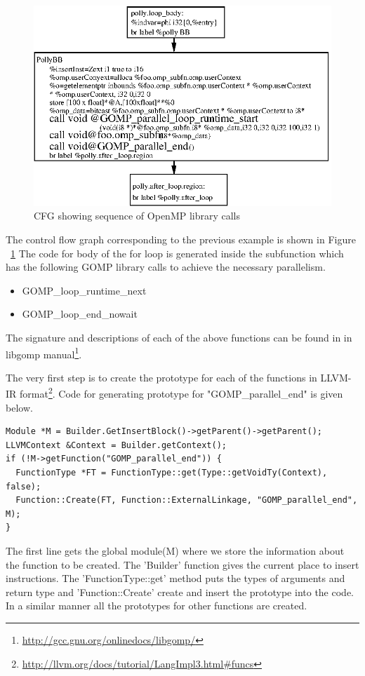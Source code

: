 \begin{figure}
\begin{center}
  \includegraphics[width=14cm]{images/ompcalls.eps}
  \caption{CFG showing sequence of OpenMP library calls}
  \label{fig:openmp_cfg}
\end{center}
\end{figure}

The control flow graph corresponding to the previous example is shown in Figure ~\ref{fig:openmp_cfg}
The code for body of the for loop is generated inside the subfunction which has the following GOMP library
calls to achieve the necessary parallelism.

\begin{itemize}
\item GOMP\_loop\_runtime\_next
\item GOMP\_loop\_end\_nowait
\end{itemize}

The signature and descriptions of each of the above functions can be found in in libgomp manual\footnote{\url{http://gcc.gnu.org/onlinedocs/libgomp/}}.

The very first step is to create the prototype for each of the functions in LLVM-IR format\footnote{\url{http://llvm.org/docs/tutorial/LangImpl3.html\#funcs}}.
Code for generating prototype for "GOMP\_parallel\_end" is given below.
{\footnotesize
\begin{lstlisting}
Module *M = Builder.GetInsertBlock()->getParent()->getParent();
LLVMContext &Context = Builder.getContext();
if (!M->getFunction("GOMP_parallel_end")) {
  FunctionType *FT = FunctionType::get(Type::getVoidTy(Context), false);
  Function::Create(FT, Function::ExternalLinkage, "GOMP_parallel_end", M);
}
\end{lstlisting}
}
The first line gets the global module(M) where we store the information about the function to be created.
The 'Builder' function gives the current place to insert instructions. The 'FunctionType::get' method
puts the types of arguments and return type and 'Function::Create' create and insert the prototype
into the code. In a similar manner all the prototypes for other functions are created.

